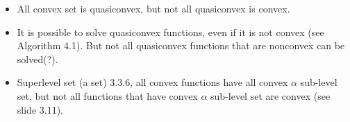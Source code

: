 \documentclass{article}
\begin{document}
\begin{landscape}
    \begin{itemize}
        \item All convex set is quasiconvex, but not all quasiconvex is convex.
        \item It is possible to solve quasiconvex functions, even if it is not convex (see Algorithm 4.1). But not all quasiconvex functions that are nonconvex can be solved(?).
        \item Superlevel set (a set) 3.3.6, all convex functions have all convex \(\alpha\) sub-level set, but not all functions that have convex \(\alpha\) sub-level set are convex (see slide 3.11).

    \end{itemize}
\end{landscape}
\end{document}
